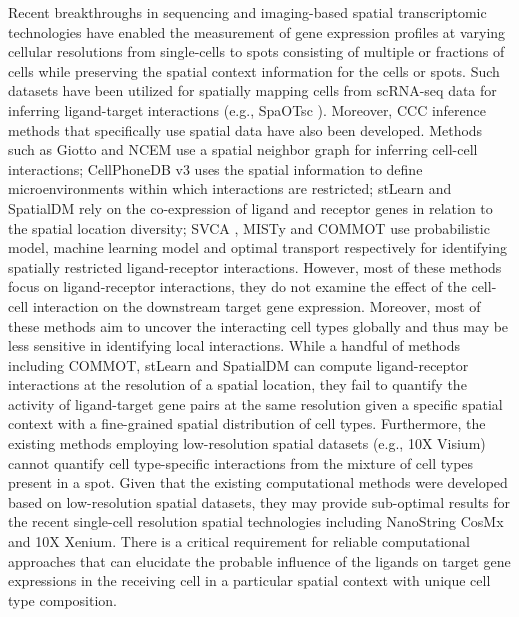 Recent breakthroughs in sequencing \citep{slide-seq,CHEN20221777} and imaging-based \citep{Eng2019} spatial transcriptomic technologies have enabled the measurement of gene expression profiles at varying cellular resolutions from single-cells to spots consisting of multiple or fractions of cells while preserving the spatial context information for the cells or spots. Such datasets have been utilized for spatially mapping cells from scRNA-seq data for inferring ligand-target interactions (e.g., SpaOTsc \citep{Cang2020}). Moreover, CCC inference methods that specifically use spatial data have also been developed. Methods such as Giotto \citep{Dries2021} and NCEM \citep{Fischer2023} use a spatial neighbor graph for inferring cell-cell interactions; CellPhoneDB v3 \citep{Garcia-Alonso2021} uses the spatial information to define microenvironments within which interactions are restricted; stLearn \citep{Pham2020.05.31.125658} and SpatialDM \citep{Li2023} rely on the co-expression of ligand and receptor genes in relation to the spatial location diversity; SVCA \citep{ARNOL2019202}, MISTy \citep{Tanevski2022} and COMMOT \citep{Cang2023} use probabilistic model, machine learning model and optimal transport respectively for identifying spatially restricted ligand-receptor interactions. However, most of these methods focus on ligand-receptor interactions, they do not examine the effect of the cell-cell interaction on the downstream target gene expression. Moreover, most of these methods aim to uncover the interacting cell types globally and thus may be less sensitive in identifying local interactions. While a handful of methods including COMMOT, stLearn and SpatialDM can compute ligand-receptor interactions at the resolution of a spatial location, they fail to quantify the activity of ligand-target gene pairs at the same resolution given a specific spatial context with a fine-grained spatial distribution of cell types. Furthermore, the existing methods employing low-resolution spatial datasets (e.g., 10X Visium) cannot quantify cell type-specific interactions from the mixture of cell types present in a spot. Given that the existing computational methods were developed based on low-resolution spatial datasets, they may provide sub-optimal results for the recent single-cell resolution spatial technologies including NanoString CosMx and 10X Xenium. There is a critical requirement for reliable computational approaches that can elucidate the probable influence of the ligands on target gene expressions in the receiving cell in a particular spatial context with unique cell type composition.

